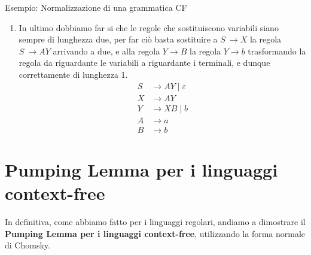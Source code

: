 \begin{generalbox}[colframe=azure-gradient-3!90!black]{Esempio: Normalizzazione di una grammatica CF}
\begin{enumerate}
      L'aggiunta non modifica la grammatica in quanto $S\ \implies \varepsilon \equiv S \implies X\ \implies \varepsilon$.

      La rimozione però andrebbe a precludere tutte le sostituzioni di $X$ con $\varepsilon$ possibili nella grammatica originale.

      Per ovviare a ciò, è sufficiente aggiungere per ogni regola contenente $X$ a destra una regola identica con $X$ rimosso da destra.
      \begin{equation}
        \begin{split}
          S &\to X \mid \varepsilon \\
          X &\to AY \\
          Y &\to XB \mid B \\
          A &\to a \\
          B &\to b
        \end{split}
      \end{equation}
    \item[$G_5$]
      In ultimo dobbiamo far si che le regole che sostituiscono variabili siano sempre di lunghezza due, per far ciò basta sostituire a $S\ \to X$ la regola $S\ \to AY$ arrivando a due, e alla regola $Y \to B$ la regola $Y \to b$ trasformando la regola da riguardante le variabili a riguardante i terminali, e dunque correttamente di lunghezza 1.
      \begin{equation}
        \begin{split}
          S &\to AY \mid \varepsilon \\
          X &\to AY \\
          Y &\to XB \mid b\\
          A &\to a \\
          B &\to b
        \end{split}
      \end{equation}
  \end{enumerate}


\end{generalbox}

\newpage

\section{Pumping Lemma per i linguaggi context-free}

In definitiva, come abbiamo fatto per i linguaggi regolari, andiamo a dimostrare il \textbf{Pumping Lemma per i linguaggi context-free}, utilizzando la forma normale di Chomsky.

